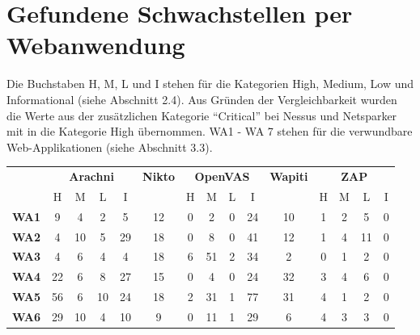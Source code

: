 \documentclass[12pt,oneside,a4paper,parskip,pointlessnumbers]{scrbook}
\begin{document}
  \section{Gefundene Schwachstellen per Webanwendung}
   Die Buchstaben H, M, L und I stehen für die Kategorien High, Medium, Low und Informational (siehe Abschnitt 2.4). Aus Gründen der Vergleichbarkeit wurden die Werte aus der zusätzlichen Kategorie ``Critical'' bei Nessus und Netsparker mit in die Kategorie High übernommen. WA1 - WA 7 stehen für die verwundbare Web-Applikationen (siehe Abschnitt 3.3).\\
     \begin{table}[H]
      \begin{tabular}{|r|c|c|c|c|c|c|c|c|c|c|c|c|c|c|}
        \cline{2-15}
        \multicolumn{1}{r|}{}       & \multicolumn{4}{c|}{\textbf{Arachni}} & \textbf{Nikto} & \multicolumn{4}{c|}{\textbf{OpenVAS}} & \textbf{Wapiti} & \multicolumn{4}{c|}{\textbf{ZAP}}  \\
        \cline{2-15}
        \multicolumn{1}{r|}{}       & H & M & L & I              &                & H & M & L & I              &                 & H & M & L & I                        \\
        \hline
        \textbf{WA1}      & 9    & 4    & 2   & 5                 & 12             & 0    & 2    & 0   & 24                & 10              & 1    & 2    & 5   & 0                           \\
        \hline
        \textbf{WA2}        & 4    & 10   & 5   & 29                & 18             & 0    & 8    & 0   & 41                & 12              & 1    & 4    & 11  & 0                           \\
        \hline
        \textbf{WA3}          & 4    & 6    & 4   & 4                 & 18             & 6    & 51   & 2   & 34                & 2               & 0    & 1    & 2   & 0                           \\
        \hline
        \textbf{WA4}    & 22   & 6    & 8   & 27                & 15             & 0    & 4    & 0   & 24                & 32              & 3    & 4    & 6   & 0                           \\
        \hline
        \textbf{WA5}             & 56   & 6    & 10  & 24                & 18             & 2    & 31   & 1   & 77                & 31              & 4    & 1    & 2   & 0                           \\
        \hline
        \textbf{WA6}      & 29   & 10   & 4   & 10                & 9              & 0    & 11   & 1   & 29                & 6               & 4    & 3    & 3   & 0                           \\

\end{tabular}
\end{table}
\end{document}
